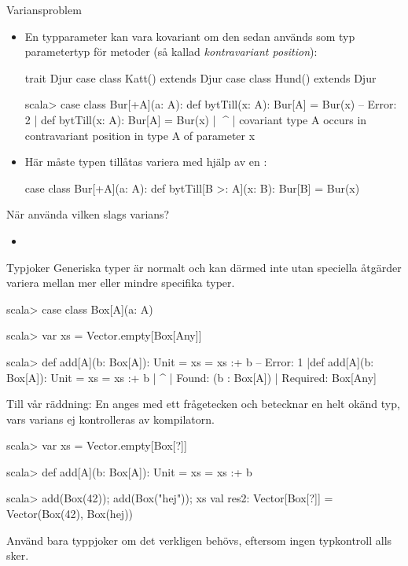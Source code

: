 \begin{Slide}{Variansproblem}
\begin{itemize}\SlideFontSmall
\item En typparameter kan  vara kovariant om den sedan används som typ parametertyp för metoder (så kallad \emph{kontravariant position}):
\begin{Code}
trait Djur
case class Katt() extends Djur
case class Hund() extends Djur
\end{Code}
\begin{REPLsmall}
scala> case class Bur[+A](a: A): 
         def bytTill(x: A): Bur[A] = Bur(x)
-- Error:
2 |  def bytTill(x: A): Bur[A] = Bur(x)
  |          ^^^^
  |  covariant type A occurs in contravariant position in type A of parameter x
\end{REPLsmall}
\item Här måste typen tillåtas variera med hjälp av en :
\begin{Code}
case class Bur[+A](a: A): 
  def bytTill[B >: A](x: B): Bur[B] = Bur(x)
\end{Code}
\end{itemize}
\end{Slide}

\begin{Slide}{När använda vilken slags varians?}
\begin{itemize}
\item 
\end{itemize}
\end{Slide}


\begin{Slide}{Typjoker }\SlideFontSmall
Generiska typer är normalt  och kan därmed inte utan speciella åtgärder variera mellan mer eller mindre specifika typer. %
\begin{REPLsmall}
scala> case class Box[A](a: A)

scala> var xs = Vector.empty[Box[Any]]

scala> def add[A](b: Box[A]): Unit = xs = xs :+ b
-- Error:
1 |def add[A](b: Box[A]): Unit = xs = xs :+ b
  |                                         ^
  |                                         Found:    (b : Box[A])
  |                                         Required: Box[Any]
\end{REPLsmall}  
Till vår räddning: En   anges med ett frågetecken och betecknar en helt okänd typ, vars varians ej kontrolleras av kompilatorn.
\begin{REPLsmall}
scala> var xs = Vector.empty[Box[?]]

scala> def add[A](b: Box[A]): Unit = xs = xs :+ b

scala> add(Box(42)); add(Box("hej")); xs
val res2: Vector[Box[?]] = Vector(Box(42), Box(hej))
\end{REPLsmall}
Använd bara typpjoker om det verkligen behövs, eftersom ingen typkontroll alls sker.
\end{Slide}


